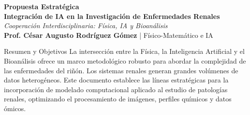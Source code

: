 \documentclass[12pt,letterpaper]{article}
\begin{document}
\begin{center}
    {\Huge \textbf{\color{primarycolor} Propuesta Estratégica}}\\[0.3cm]
    {\Large \textbf{\color{secondarycolor} Integración de IA en la Investigación de Enfermedades Renales}}\\[0.4cm]
    {\large \textit{\color{accentcolor} Cooperación Interdisciplinaria: Física, IA y Bioanálisis}}\\[0.4cm]
    {\normalsize \textbf{Prof. César Augusto Rodríguez Gómez} | Físico-Matemático e IA}
\end{center}

\vspace{0.5cm}

\begin{infobox}[colframe=accentcolor, colback=accentcolor!5, no shadow]{Resumen y Objetivos}
    La intersección entre la Física, la Inteligencia Artificial y el Bioanálisis ofrece un marco metodológico robusto para abordar la complejidad de las enfermedades del riñón. Los sistemas renales generan grandes volúmenes de datos heterogéneos. Este documento establece las líneas estratégicas para la incorporación de modelado computacional aplicado al estudio de patologías renales, optimizando el procesamiento de imágenes, perfiles químicos y datos ómicos.
\end{infobox}

\vspace{0.4cm}
\end{document}
